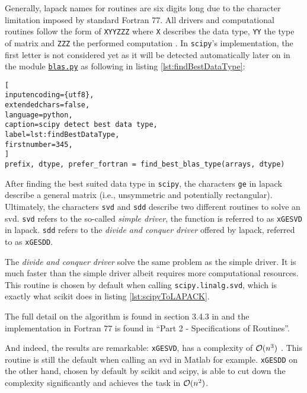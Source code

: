 Generally, \acrshort{lapack} names for routines are six digits long due to the character limitation imposed by standard Fortran 77.
All drivers and computational routines follow the form of \texttt{XYYZZZ} where \texttt{X} describes the data type, \texttt{YY} the type of matrix and \texttt{ZZZ} the performed computation \cite{anderson1999lapack}.
In \texttt{scipy}'s implementation, the first letter is not considered yet as it will be detected automatically later on in the module \href{\scipyvIxVIIxII{blas}}{\texttt{blas.py}} as following in listing \ref{lst:findBestDataType}:

\begin{lstlisting}[
inputencoding={utf8}, 
extendedchars=false, 
language=python, 
caption=scipy detect best data type, 
label=lst:findBestDataType,
firstnumber=345,
]
prefix, dtype, prefer_fortran = find_best_blas_type(arrays, dtype)
\end{lstlisting}

After finding the best suited data type in \texttt{scipy}, the characters \texttt{ge} in \acrshort{lapack} describe a general matrix (i.e., unsymmetric and potentially rectangular).
Ultimately, the characters \texttt{svd} and \texttt{sdd} describe two different routines to solve an \gls{svd}.
\texttt{svd} refers to the so-called \emph{simple driver}, the function is referred to as \texttt{xGESVD} in \acrshort{lapack}.
\texttt{sdd} refers to the \emph{divide and conquer driver} offered by \acrshort{lapack}, referred to as \texttt{xGESDD}.
\medskip

The \emph{divide and conquer driver} solve the same problem as the simple driver.
It is much faster than the simple driver albeit requires more computational resources.
This routine is chosen by default when calling \texttt{scipy.linalg.svd}, which is exactly what \gls{scikit} does in listing \ref{lst:scipyToLAPACK}.

The full detail on the algorithm is found in section 3.4.3 in  \cite{anderson1999lapack} and the implementation in Fortran 77 is found in ``Part 2 - Specifications of Routines''.
\bigskip

And indeed, the results are remarkable: \texttt{xGESVD}, has a complexity of $\mathcal{O}(n^3)$ \cite{wright2001large}.
This routine is still the default when calling an \gls{svd} in Matlab for example.
\texttt{xGESDD} on the other hand, chosen by default by scikit and scipy, is able to cut down the complexity significantly and achieves the task in $\mathcal{O}(n^2)$\cite{anderson1999lapack}.

